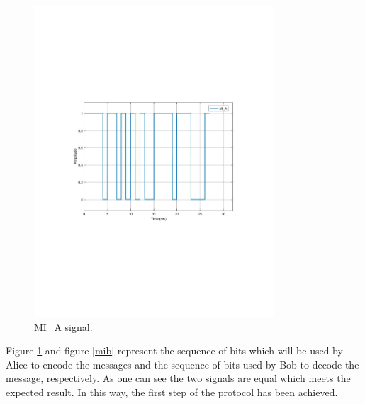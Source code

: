 \begin{figure}[H]
    \centering
        \includegraphics[clip, trim=3cm 9.0cm 2cm 7cm, width=0.80\textwidth]{./sdf/bb84_with_discrete_variables/figures_raw/mia.pdf}
    \caption{MI\_A signal. }\label{mia}
\end{figure}

Figure \ref{mia} and figure \ref{mib} represent the sequence of bits which will be used by Alice to encode the messages and the sequence of bits used by Bob to decode the message, respectively. As one can see the two signals are equal which meets the expected result. In this way, the first step of the protocol has been achieved.

